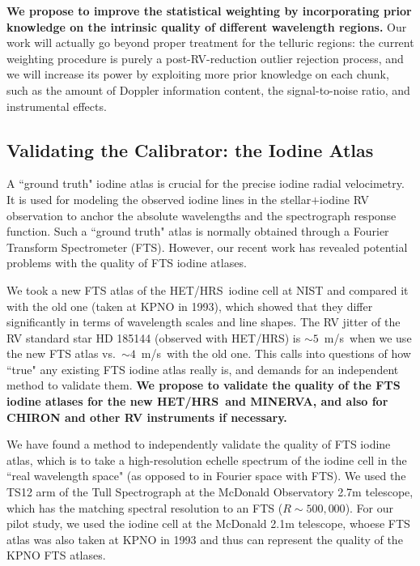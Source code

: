 \documentclass[12pt]{article}
\def\mps{m/s}
\def\minerva{MINERVA}
\def\hrs{HET/HRS}
\begin{document}
\textbf{We propose to improve the statistical weighting by
  incorporating prior knowledge on the intrinsic quality of different
  wavelength regions.} Our work will actually go beyond proper
treatment for the telluric regions: the current weighting procedure is
purely a post-RV-reduction outlier rejection process, and we will
increase its power by exploiting more prior knowledge on each chunk,
such as the amount of Doppler information content, the signal-to-noise
ratio, and instrumental effects.


\vspace{-3pt}
\subsection{Validating the Calibrator: the Iodine Atlas}\label{sec:fts}

A ``ground truth" iodine atlas is crucial for the precise iodine radial
velocimetry. It is used for modeling the observed iodine lines in the
stellar$+$iodine RV observation to anchor the absolute wavelengths and
the spectrograph response function. Such a ``ground truth" atlas is
normally obtained through a Fourier Transform Spectrometer
(FTS). However, our recent work has revealed potential problems with
the quality of FTS iodine atlases.

We took a new FTS atlas of the \hrs\ iodine cell at NIST and compared
it with the old one (taken at KPNO in 1993), which showed that they
differ significantly in terms of wavelength scales and line
shapes. The RV jitter of the RV standard star HD 185144 (observed with
\hrs) is $\sim5$~\mps\ when we use the new FTS atlas
vs.~$\sim4$~\mps\ with the old one. This calls into questions of how
``true" any existing FTS iodine atlas really is, and demands for an
independent method to validate them. \textbf{We propose to validate
  the quality of the FTS iodine atlases for the new \hrs\ and
  \minerva, and also for CHIRON and other RV instruments if
  necessary.}

We have found a method to independently validate the quality of FTS
iodine atlas, which is to take a high-resolution echelle spectrum of
the iodine cell in the ``real wavelength space" (as opposed to in
Fourier space with FTS). We used the TS12 arm of the Tull Spectrograph
at the McDonald Observatory 2.7m telescope, which has the matching
spectral resolution to an FTS ($R \sim 500,000$). For our pilot study,
we used the iodine cell at the McDonald 2.1m telescope, whoese FTS
atlas was also taken at KPNO in 1993 and thus can represent the
quality of the KPNO FTS atlases.
\end{document}
